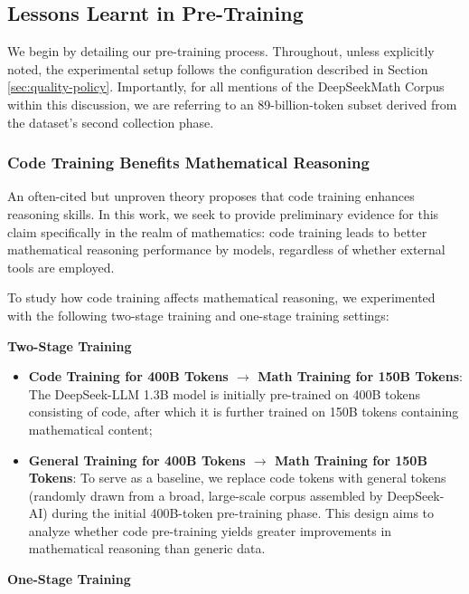 \begin{itemize}[topsep=0pt]
\begin{itemize}[topsep=0pt]
\subsection{Lessons Learnt in Pre-Training}

We begin by detailing our pre-training process. Throughout, unless explicitly noted, the experimental setup follows the configuration described in Section \ref{sec:quality-policy}. Importantly, for all mentions of the DeepSeekMath Corpus within this discussion, we are referring to an 89-billion-token subset derived from the dataset’s second collection phase.

\subsubsection{Code Training Benefits Mathematical Reasoning}

An often-cited but unproven theory proposes that code training enhances reasoning skills. In this work, we seek to provide preliminary evidence for this claim specifically in the realm of mathematics: code training leads to better mathematical reasoning performance by models, regardless of whether external tools are employed.

To study how code training affects mathematical reasoning, we experimented with the following two-stage training and one-stage training settings:

\textbf{Two-Stage Training}

\begin{itemize}[topsep=0pt]
    \item \textbf{Code Training for 400B Tokens $\rightarrow$ Math Training for 150B Tokens}: The DeepSeek-LLM 1.3B model is initially pre-trained on 400B tokens consisting of code, after which it is further trained on 150B tokens containing mathematical content;
    \item \textbf{General Training for 400B Tokens $\rightarrow$ Math Training for 150B Tokens}: To serve as a baseline, we replace code tokens with general tokens (randomly drawn from a broad, large-scale corpus assembled by DeepSeek-AI) during the initial 400B-token pre-training phase. This design aims to analyze whether code pre-training yields greater improvements in mathematical reasoning than generic data.
\end{itemize}

\textbf{One-Stage Training}


\end{itemize}
\end{itemize}
